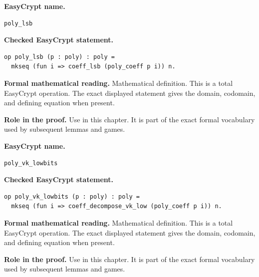 \begin{formaldefinition}
\noindent\textbf{EasyCrypt name.}
\begin{lstlisting}[language=EasyCrypt,basicstyle=\ttfamily\scriptsize]
poly_lsb
\end{lstlisting}
\noindent\textbf{Checked EasyCrypt statement.}
\begin{lstlisting}[language=EasyCrypt,basicstyle=\ttfamily\scriptsize]
op poly_lsb (p : poly) : poly =
  mkseq (fun i => coeff_lsb (poly_coeff p i)) n.
\end{lstlisting}
\noindent\textbf{Formal mathematical reading.}
Mathematical definition. This is a total EasyCrypt operation.  The exact displayed statement gives the domain, codomain, and defining equation when present.

\noindent\textbf{Role in the proof.}
Use in this chapter. It is part of the exact formal vocabulary used by subsequent lemmas and games.

\end{formaldefinition}

\begin{formaldefinition}
\noindent\textbf{EasyCrypt name.}
\begin{lstlisting}[language=EasyCrypt,basicstyle=\ttfamily\scriptsize]
poly_vk_lowbits
\end{lstlisting}
\noindent\textbf{Checked EasyCrypt statement.}
\begin{lstlisting}[language=EasyCrypt,basicstyle=\ttfamily\scriptsize]
op poly_vk_lowbits (p : poly) : poly =
  mkseq (fun i => coeff_decompose_vk_low (poly_coeff p i)) n.
\end{lstlisting}
\noindent\textbf{Formal mathematical reading.}
Mathematical definition. This is a total EasyCrypt operation.  The exact displayed statement gives the domain, codomain, and defining equation when present.

\noindent\textbf{Role in the proof.}
Use in this chapter. It is part of the exact formal vocabulary used by subsequent lemmas and games.

\end{formaldefinition}

